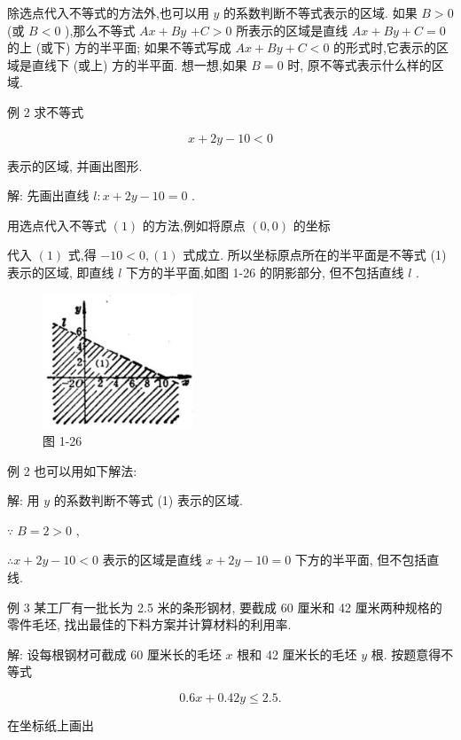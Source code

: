 \documentclass[lang=cn,newtx,10pt,scheme=chinese]{elegantbook}
\begin{document}
除选点代入不等式的方法外,也可以用 \(y\) 的系数判断不等式表示的区域. 如果 \(B > 0\) (或 \(B < 0\) ),那么不等式 \({Ax} + {By}\) \(+ C > 0\) 所表示的区域是直线 \({Ax} + {By} + C = 0\) 的上 (或下) 方的半平面; 如果不等式写成 \({Ax} + {By} + C < 0\) 的形式时,它表示的区域是直线下 (或上) 方的半平面. 想一想,如果 \(B = 0\) 时, 原不等式表示什么样的区域.

例 2 求不等式

\[
  x + {2y} - {10} < 0 \tag{1}
\]

表示的区域, 并画出图形.

解: 先画出直线 \(l : x + {2y} - {10} = 0\) .

用选点代入不等式 \(\left( 1\right)\) 的方法,例如将原点 \(\left( {0,0}\right)\) 的坐标

代入 \(\left( 1\right)\) 式,得 \(- {10} < 0,\left( 1\right)\) 式成立. 所以坐标原点所在的半平面是不等式 (1) 表示的区域, 即直线 \(l\) 下方的半平面,如图 1-26 的阴影部分, 但不包括直线 \(l\) .

\begin{figure}[h]
  \centering
  \includegraphics[max width=0.4\textwidth]{images/01912cc2-ffb6-728e-9ae7-b113ff05c64b_34_186358.jpg}
  \caption{图 1-26}
\end{figure}



例 2 也可以用如下解法:

解: 用 \(y\) 的系数判断不等式 (1) 表示的区域.

\(\because \;B = 2 > 0\) ,

\(\therefore x + {2y} - {10} < 0\) 表示的区域是直线 \(x + {2y} - {10} = 0\) 下方的半平面, 但不包括直线.

例 3 某工厂有一批长为 2.5 米的条形钢材, 要截成 60 厘米和 42 厘米两种规格的零件毛坯, 找出最佳的下料方案并计算材料的利用率.

解: 设每根钢材可截成 60 厘米长的毛坯 \(x\) 根和 42 厘米长的毛坯 \(y\) 根. 按题意得不等式

\[
    {0.6x} + {0.42y} \leq {2.5}\text{.} \tag{1}
\]

在坐标纸上画出
\end{document}
